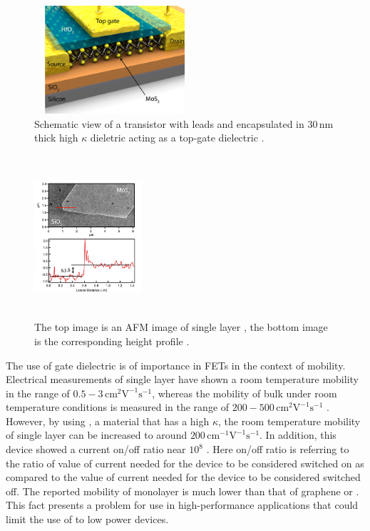 \documentclass[%
 reprint,
 amsmath,amssymb,
 aps,
pra,
floatfix,
]{revtex4-1}
\begin{document}
\begin{figure}
\includegraphics[width=6cm,height=4cm]{../figs/mos2fet}
\caption{Schematic view of a  transistor with  leads and encapsulated in $30 \mathrm{\,nm}$ thick high $\kappa$ dieletric  acting as a top-gate dielectric \cite{Kis2011, Lembke2015}.}
\label{fig:mos2fet}
\end{figure}
\begin{figure}
\includegraphics[width=4cm,height=6cm]{../figs/mos2fetAFM}
\caption{The top image is an AFM image of single layer , the bottom image is the corresponding height profile \cite{Lembke2015}.}
\label{fig:mos2profile}
\end{figure}
The use of gate dielectric is of importance in FETs in the context of mobility. Electrical measurements of single layer  have shown a room temperature mobility in the range of $0.5-3\mathrm{\,cm^2}\mathrm{V}^{-1}\mathrm{s}^{-1}$, whereas the mobility of bulk  under room temperature conditions is measured in the range of $200-500\mathrm{\,cm}^{2}\mathrm{V}^{-1}\mathrm{s}^{-1}$ \cite{novoselovEtAl2005, Ghatak2011, Fivaz1967}. However, by using , a material that has a high $\kappa$, the room temperature mobility of single layer  can be increased to around $200 \mathrm{\,cm}^{-1}\mathrm{V}^{-1}\mathrm{s}^{-1}$. In addition, this device showed a current on/off ratio near $10^8$ \cite{Kis2011}. Here on/off ratio is referring to the ratio of value of current needed for the device to be considered switched on as compared to the value of current needed for the device to be considered switched off. The reported mobility of monolayer  is much lower than that of graphene or  \cite{Kim2011}. This fact presents a problem for use in high-performance applications that could limit the use of  to low power devices.\\ \\
\end{document}
